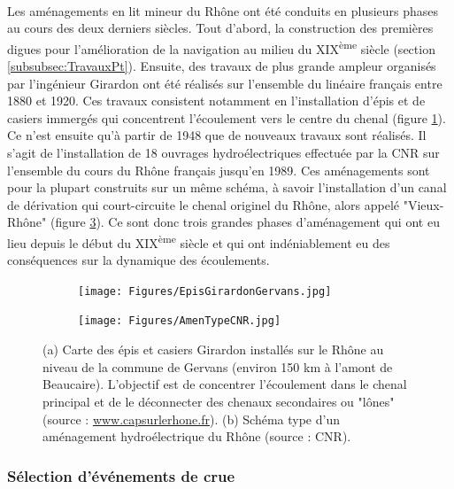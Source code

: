\documentclass[11pt]{article}
\begin{document}
	\paragraph{} Les aménagements en lit mineur du Rhône ont été conduits en plusieurs phases au cours des deux derniers siècles. Tout d'abord, la construction des premières digues pour l'amélioration de la navigation au milieu du XIX\textsuperscript{ème} siècle (section \ref{subsubsec:TravauxPt}). Ensuite, des travaux de plus grande ampleur organisés par l'ingénieur Girardon ont été réalisés sur l'ensemble du linéaire français entre 1880 et 1920. Ces travaux consistent notamment en l'installation d'épis et de casiers immergés qui concentrent l'écoulement vers le centre du chenal (figure \ref{subfig:Girardon}). Ce n'est ensuite qu'à partir de 1948 que de nouveaux travaux sont réalisés. Il s'agit de l'installation de 18 ouvrages hydroélectriques effectuée par la CNR sur l'ensemble du cours du Rhône français jusqu'en 1989. Ces aménagements sont pour la plupart construits sur un même schéma, à savoir l'installation d'un canal de dérivation qui court-circuite le chenal originel du Rhône, alors appelé "Vieux-Rhône" (figure \ref{subfig:SchemaCNR}). Ce sont donc trois grandes phases d'aménagement qui ont eu lieu depuis le début du XIX\textsuperscript{ème} siècle et qui ont indéniablement eu des conséquences sur la dynamique des écoulements. 
	
	\begin{figure}[h!]
		\centering
		\begin{subfigure}{0.7\linewidth}
		\texttt{[image: Figures/EpisGirardonGervans.jpg]}
		\caption{}
		\label{subfig:Girardon}
		\end{subfigure}	
		\begin{subfigure}{0.5\linewidth}
		\centering
		\texttt{[image: Figures/AmenTypeCNR.jpg]}
		\caption{}
		\label{subfig:SchemaCNR}
		\end{subfigure}
		\caption{(a) Carte des épis et casiers Girardon installés sur le Rhône au niveau de la commune de Gervans (environ 150 km à l'amont de Beaucaire). L'objectif est de concentrer l'écoulement dans le chenal principal et de le déconnecter des chenaux secondaires ou "lônes" (source : \url{www.capsurlerhone.fr}). (b) Schéma type d'un aménagement hydroélectrique du Rhône (source : CNR).}
	\end{figure}		

	\FloatBarrier
		
	\subsubsection{Sélection d'événements de crue}
	
\end{document}
